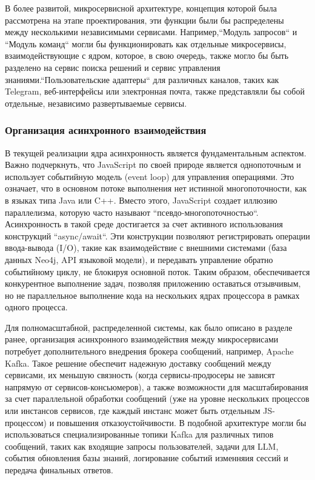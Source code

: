 В более развитой, микросервисной архитектуре, концепция которой была рассмотрена на этапе проектирования, эти функции были бы распределены между несколькими независимыми сервисами. Например,``Модуль запросов`` и ``Модуль команд`` могли бы функционировать как отдельные микросервисы, взаимодействующие с ядром, которое, в свою очередь, также могло бы быть разделено на сервис поиска решений и сервис управления знаниями.``Пользовательские адаптеры`` для различных каналов, таких как Telegram, веб-интерфейсы или электронная почта, также представляли бы собой отдельные, независимо развертываемые сервисы.

\subsubsection{Организация асинхронного взаимодействия}

В текущей реализации ядра асинхронность является фундаментальным аспектом. Важно подчеркнуть, что JavaScript по своей природе является однопоточным и использует событийную модель (event loop) для управления операциями. Это означает, что в основном потоке выполнения нет истинной многопоточности, как в языках типа Java или C++. Вместо этого, JavaScript создает иллюзию параллелизма, которую часто называют ``псевдо-многопоточностью``. Асинхронность в такой среде достигается за счет активного использования конструкций ``async/await``. Эти конструкции позволяют регистрировать операции ввода-вывода (I/O), такие как взаимодействие с внешними системами (база данных Neo4j, API языковой модели), и передавать управление обратно событийному циклу, не блокируя основной поток. Таким образом, обеспечивается конкурентное выполнение задач, позволяя приложению оставаться отзывчивым, но не параллельное выполнение кода на нескольких ядрах процессора в рамках одного процесса. 

Для полномасштабной, распределенной системы, как было описано в разделе ранее, организация асинхронного взаимодействия между микросервисами потребует дополнительного внедрения брокера сообщений, например, Apache Kafka\cite{Kafka}. Такое решение обеспечит надежную доставку сообщений между сервисами, их меньшую связность (когда сервисы-продюсеры не зависят напрямую от сервисов-консьюмеров), а также возможности для масштабирования за счет параллельной обработки сообщений (уже на уровне нескольких процессов или инстансов сервисов, где каждый инстанс может быть отдельным JS-процессом) и повышения отказоустойчивости. В подобной архитектуре могли бы использоваться специализированные топики Kafka для различных типов сообщений, таких как входящие запросы пользователей, задачи для LLM, события обновления базы знаний, логирование событий изменняия сессий и передача финальных ответов.

